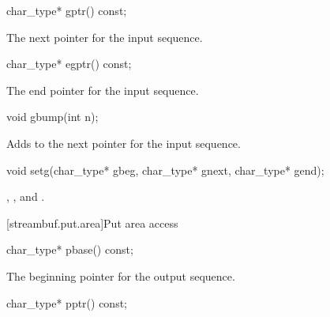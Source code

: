 %
\begin{itemdecl}
char_type* gptr() const;
\end{itemdecl}

\begin{itemdescr}
\pnum
\returns
The next pointer for the input sequence.
\end{itemdescr}

%
\begin{itemdecl}
char_type* egptr() const;
\end{itemdecl}

\begin{itemdescr}
\pnum
\returns
The end pointer for the input sequence.
\end{itemdescr}

%
\begin{itemdecl}
void gbump(int n);
\end{itemdecl}

\begin{itemdescr}
\pnum
\effects
Adds  to the next pointer for the input sequence.
\end{itemdescr}

%
\begin{itemdecl}
void setg(char_type* gbeg, char_type* gnext, char_type* gend);
\end{itemdecl}

\begin{itemdescr}
\pnum
\postconditions
{},
,
and
.
\end{itemdescr}

[streambuf.put.area]{Put area access}

%
\begin{itemdecl}
char_type* pbase() const;
\end{itemdecl}

\begin{itemdescr}
\pnum
\returns
The beginning pointer for the output sequence.
\end{itemdescr}

%
\begin{itemdecl}
char_type* pptr() const;
\end{itemdecl}

